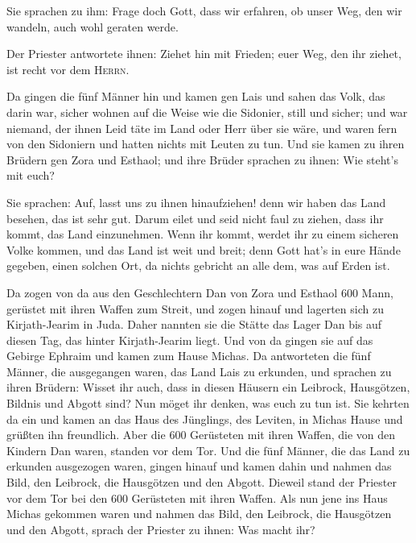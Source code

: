  Sie sprachen zu ihm: Frage doch Gott, dass wir erfahren,
ob unser Weg, den wir wandeln, auch wohl geraten werde.

 Der Priester antwortete ihnen: Ziehet hin mit Frieden;
euer Weg, den ihr ziehet, ist recht vor dem \textsc{Herrn}.

 Da gingen die fünf Männer hin und kamen gen Lais und
sahen das Volk, das darin war, sicher wohnen auf die Weise wie die
Sidonier, still und sicher; und war niemand, der ihnen Leid täte im Land
oder Herr über sie wäre, und waren fern von den Sidoniern und hatten
nichts mit Leuten zu tun.  Und sie kamen zu ihren Brüdern
gen Zora und Esthaol; und ihre Brüder sprachen zu ihnen: Wie steht's mit
euch?

 Sie sprachen: Auf, lasst uns zu ihnen hinaufziehen! denn
wir haben das Land besehen, das ist sehr gut. Darum eilet und seid nicht
faul zu ziehen, dass ihr kommt, das Land einzunehmen. 
Wenn ihr kommt, werdet ihr zu einem sicheren Volke kommen, und das Land
ist weit und breit; denn Gott hat's in eure Hände gegeben, einen solchen
Ort, da nichts gebricht an alle dem, was auf Erden ist.

 Da zogen von da aus den Geschlechtern Dan von Zora und
Esthaol 600 Mann, gerüstet mit ihren Waffen zum Streit, 
und zogen hinauf und lagerten sich zu Kirjath-Jearim in Juda. Daher
nannten sie die Stätte das Lager Dan bis auf diesen Tag, das hinter
Kirjath-Jearim liegt.  Und von da gingen sie auf das
Gebirge Ephraim und kamen zum Hause Michas.  Da
antworteten die fünf Männer, die ausgegangen waren, das Land Lais zu
erkunden, und sprachen zu ihren Brüdern: Wisset ihr auch, dass in diesen
Häusern ein Leibrock, Hausgötzen, Bildnis und Abgott sind? Nun möget ihr
denken, was euch zu tun ist.  Sie kehrten da ein und
kamen an das Haus des Jünglings, des Leviten, in Michas Hause und
grüßten ihn freundlich.  Aber die 600 Gerüsteten mit
ihren Waffen, die von den Kindern Dan waren, standen vor dem Tor.
 Und die fünf Männer, die das Land zu erkunden ausgezogen
waren, gingen hinauf und kamen dahin und nahmen das Bild, den Leibrock,
die Hausgötzen und den Abgott. Dieweil stand der Priester vor dem Tor
bei den 600 Gerüsteten mit ihren Waffen.  Als nun jene
ins Haus Michas gekommen waren und nahmen das Bild, den Leibrock, die
Hausgötzen und den Abgott, sprach der Priester zu ihnen: Was macht ihr?

